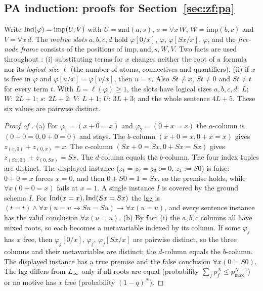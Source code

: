 \subsection{PA induction: proofs for Section~\ref{sec:zf:pa}}\label{app:zf:pa}

Write $\mathrm{Ind}(\varphi)=\mathrm{imp}(U,V)$ with $U=\mathrm{and}(a,s)$, $s=\forall x\,W$, $W=\mathrm{imp}(b,c)$ and
$V=\forall x\,d$. The \emph{motive slots} $a,b,c,d$ hold $\varphi[0/x]$, $\varphi$, $\varphi[Sx/x]$, $\varphi$, and
the \emph{five-node frame} consists of the positions of $\mathrm{imp},\mathrm{and},s,W,V$. Two facts are used throughout
: (i) substituting terms for $x$ changes neither the root of a formula nor its
\emph{logical size} $\ell$ (the number of atoms, connectives and quantifiers); (ii) if $x$ is free in $\varphi$ and
$\varphi[u/x]=\varphi[v/x]$, then $u=v$. Also $St\ne x$, $St\ne0$ and $St\ne t$ for every term $t$. With $L=\ell(\varphi)\ge1$,
the slots have logical sizes $a,b,c,d{:}\ L$; $W{:}\ 2L+1$; $s{:}\ 2L+2$; $V{:}\ L+1$; $U{:}\ 3L+3$; and the whole
sentence $4L+5$. These six values are pairwise distinct.

\begin{proof}[Proof of ]
(a) For $\varphi_1=(x+0=x)$ and $\varphi_2=(0+x=x)$ the $a$-column is $(0+0=0,0+0=0)$ and stays. The $b$-column
$(x+0=x,0+x=x)$ gives $z_{(x,0)}+z_{(0,x)}=x$. The $c$-column $(Sx+0=Sx,0+Sx=Sx)$ gives $z_{(Sx,0)}+z_{(0,Sx)}=Sx$. The
$d$-column equals the $b$-column. The four index tuples are distinct. The displayed instance ($z_1=z_2=z_3:=0$,
$z_4:=S0$) is false: $0+0=x$ forces $x=0$, and then $0+S0=1=Sx$, so the premise holds, while $\forall x(0+0=x)$ fails
at $x=1$. A single instance $I$ is covered by the ground schema $I$. For $\mathrm{Ind}(x=x),\mathrm{Ind}(Sx=Sx)$ the lgg is
$(t=t)\wedge\forall x(u=u\to Su=Su)\to\forall x(u=u)$, and every sentence instance has the valid conclusion
$\forall x(u=u)$.
(b) By fact (i) the $a,b,c$ columns all have mixed roots, so each becomes a metavariable indexed by its column. If some
$\varphi_j$ has $x$ free, then $\varphi_j[0/x]$, $\varphi_j$, $\varphi_j[Sx/x]$ are pairwise distinct, so the three
columns and their metavariables are distinct; the $d$-column equals the $b$-column. The displayed instance has a true
premise and the false conclusion $\forall x(0=S0)$. The lgg differs from $L_{\infty}$ only if all roots are equal
(probability $\sum_fp_f^N\le p_{\max}^{N-1}$) or no motive has $x$ free (probability $(1-q)^N$).
\end{proof}

